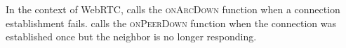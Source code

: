 In the context of WebRTC, \SPRAY calls the \textsc{onArcDown} function
when a connection establishment fails. \SPRAY calls the
\textsc{onPeerDown} function when the connection was established once
but the neighbor is no longer responding.



